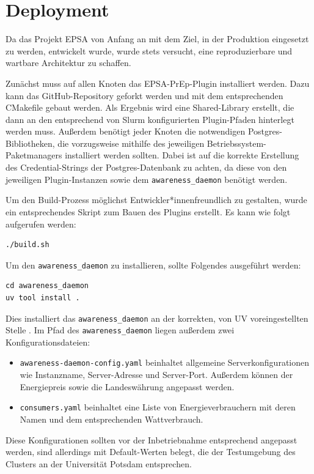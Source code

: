 \documentclass[paper=a4, fontsize=11pt]{scrartcl} %
\numberwithin{equation}{section} %
\numberwithin{figure}{section} %
\numberwithin{table}{section} %
\begin{document}
\section{Deployment}
Da das Projekt EPSA von Anfang an mit dem Ziel, in der Produktion eingesetzt zu werden, entwickelt wurde, wurde stets versucht, eine reproduzierbare und wartbare Architektur zu schaffen.

Zunächst muss auf allen Knoten das EPSA-PrEp-Plugin installiert werden. Dazu kann das GitHub-Repository geforkt werden und mit dem entsprechenden CMakefile gebaut werden. Als Ergebnis wird eine Shared-Library erstellt, die dann an den entsprechend von Slurm konfigurierten Plugin-Pfaden hinterlegt werden muss. Außerdem benötigt jeder Knoten die notwendigen Postgres-Bibliotheken, die vorzugsweise mithilfe des jeweiligen Betriebssystem-Paketmanagers installiert werden sollten. Dabei ist auf die korrekte Erstellung des Credential-Strings der Postgres-Datenbank zu achten, da diese von den jeweiligen Plugin-Instanzen sowie dem \texttt{awareness\_daemon} benötigt werden.

Um den Build-Prozess möglichst Entwickler*innenfreundlich zu gestalten, wurde ein entsprechendes Skript zum Bauen des Plugins erstellt.
Es kann wie folgt aufgerufen werden:
\begin{verbatim}
./build.sh
\end{verbatim}
Um den \texttt{awareness\_daemon} zu installieren, sollte Folgendes ausgeführt werden:
\begin{verbatim}
cd awareness_daemon
uv tool install .
\end{verbatim}
Dies installiert das \texttt{awareness\_daemon} an der korrekten, von UV voreingestellten Stelle \cite{uvdoc}. \newpage Im Pfad des \texttt{awareness\_daemon} liegen außerdem zwei Konfigurationsdateien:
\begin{itemize}
    \item \texttt{awareness-daemon-config.yaml} beinhaltet allgemeine Serverkonfigurationen wie Instanzname, Server-Adresse und Server-Port. Außerdem können der Energiepreis sowie die Landeswährung angepasst werden.
    \item \texttt{consumers.yaml} beinhaltet eine Liste von Energieverbrauchern mit deren Namen und dem entsprechenden Wattverbrauch.
\end{itemize}
Diese Konfigurationen sollten vor der Inbetriebnahme entsprechend angepasst werden, sind allerdings mit Default-Werten belegt, die der Testumgebung des Clusters an der Universität Potsdam entsprechen.
\end{document}
